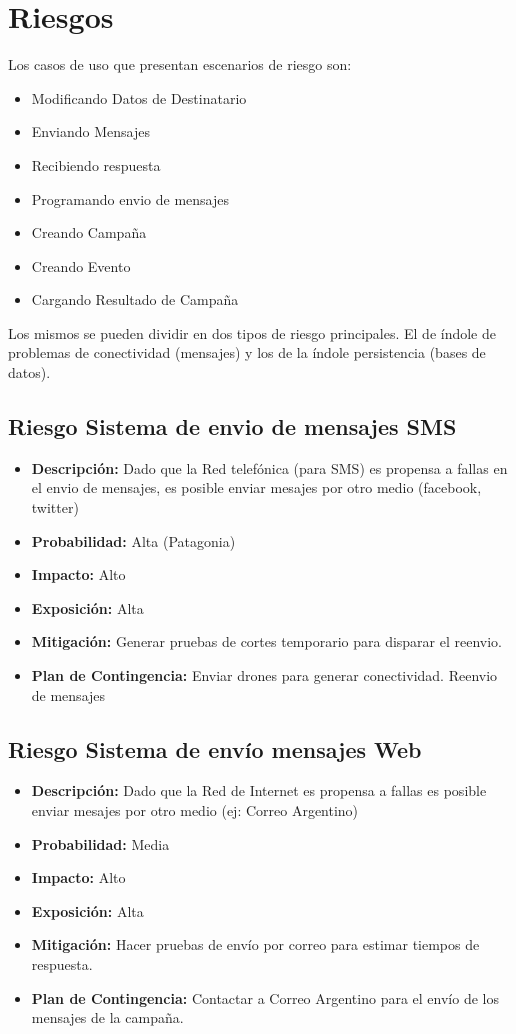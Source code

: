 \documentclass[a4paper, 11pt]{article}
\begin{document}
\newpage
\section{Riesgos}

Los casos de uso que presentan escenarios de riesgo son:
\begin{itemize}
\item Modificando Datos de Destinatario
\item Enviando Mensajes
\item Recibiendo respuesta
\item Programando envio de mensajes
\item Creando Campaña
\item Creando Evento
\item Cargando Resultado de Campaña
\end{itemize}
Los mismos se pueden dividir en dos tipos de riesgo principales. El de índole de problemas de conectividad (mensajes) y los de la índole persistencia (bases de datos).

\subsection{Riesgo Sistema de envio de mensajes SMS}
\begin{itemize}
\item \textbf{Descripci\'on:} Dado que la Red telefónica (para SMS) es propensa a fallas en el envio de mensajes, es posible enviar mesajes por otro medio (facebook, twitter)
\item \textbf{Probabilidad:} Alta (Patagonia)
\item \textbf{Impacto:} Alto
\item \textbf{Exposici\'on:} Alta
\item \textbf{Mitigaci\'on:} Generar pruebas de cortes temporario para disparar el reenvio.
\item \textbf{Plan de Contingencia:} Enviar drones para generar conectividad. Reenvio de mensajes
\end{itemize}


\subsection{Riesgo Sistema de envío mensajes Web}
\begin{itemize}
\item \textbf{Descripci\'on:} Dado que la Red de Internet es propensa a fallas es posible enviar mesajes por otro medio (ej: Correo Argentino) 
\item \textbf{Probabilidad:} Media 
\item \textbf{Impacto:} Alto
\item \textbf{Exposici\'on:} Alta
\item \textbf{Mitigaci\'on:} Hacer pruebas de env\'io por correo para estimar tiempos de respuesta. 
\item \textbf{Plan de Contingencia:} Contactar a Correo Argentino para el envío de los mensajes de la campa\~na.
\end{itemize}
\end{document}
